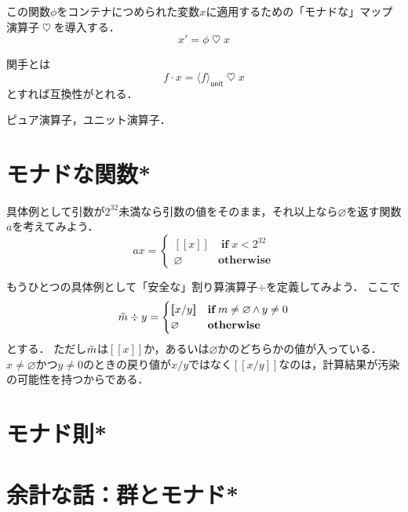\documentclass[twocolumn]{jsbook}
\def\[{[\![}
\def\]{]\!]}
\DeclareMathOperator{\hsklFmap}{\cdot}
\DeclareMathOperator{\hsklMonadMap}{\heartsuit}
\newcommand{\hsklNothing}{\varnothing}
\newcommand{\hsklJust}[1]{\[#1\]}
\newcommand{\hsklMaybe}[1]{\Tilde{#1}}
\newcommand{\hsklUnit}[1]{\langle#1\rangle_\textsf{unit}}
\newcommand{\mathKeyword}[1]{\mathbf{#1}}
\DeclareMathOperator{\mathAnd}{\wedge}
\DeclareMathOperator{\mathIf}{\mathKeyword{if}}
\newcommand{\mathOtherwise}{\mathKeyword{otherwise}}
\begin{document}
この関数$\phi$をコンテナにつめられた変数$x$に適用するための「モナドな」マップ演算子$\hsklMonadMap$を導入する．
$$x'=\phi\hsklMonadMap x$$

関手とは
$$f\hsklFmap x=\hsklUnit{f}\hsklMonadMap x$$
とすれば互換性がとれる．


ピュア演算子，ユニット演算子．

\section{モナドな関数*}

具体例として引数が$2^{32}$未満なら引数の値をそのまま，それ以上なら$\hsklNothing$を返す関数$a$を考えてみよう．
\begin{equation*}
ax=\begin{cases}
\hsklJust{x}&\mathIf x<2^{32}\\
\hsklNothing&\mathOtherwise
\end{cases}
\end{equation*}


もうひとつの具体例として「安全な」割り算演算子$\div$を定義してみよう．
ここで
\begin{equation*}
\hsklMaybe{m}\div y=\begin{cases}\hsklJust{x/y}&\mathIf m\neq\hsklNothing\mathAnd y\neq0\\
\hsklNothing&\mathOtherwise\end{cases}
\end{equation*}
とする．
ただし$\hsklMaybe{m}$は$\hsklJust{x}$か，あるいは$\hsklNothing$かのどちらかの値が入っている．
$x\neq\hsklNothing$かつ$y\neq0$のときの戻り値が$x/y$ではなく$\hsklJust{x/y}$なのは，計算結果が汚染の可能性を持つからである．



\section{モナド則*}

\section*{余計な話：群とモナド*}
\end{document}
